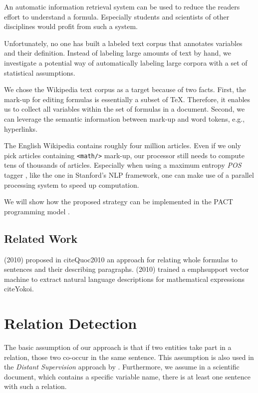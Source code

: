 \documentclass[runningheads]{llncs}
\begin{document}
An automatic information retrieval system can be used to reduce the readers
effort to understand a formula. Especially students and scientists of other
disciplines would profit from such a system.

Unfortunately, no one has built a labeled text corpus that annotates variables
and their definition. Instead of labeling large amounts of text by hand, we
investigate a potential way of automatically labeling large corpora with a set
of statistical assumptions.

We chose the Wikipedia text corpus as a target because of two facts. First,
the mark-up for editing formulas is essentially a subset of \TeX. Therefore,
it enables us to collect all variables within the set of formulas in a
document. Second, we can leverage the semantic information between mark-up and
word tokens, e.g., hyperlinks.

The English Wikipedia contains roughly four million articles. Even if we only
pick articles containing \texttt{<math/>} mark-up, our processor still needs
to compute tens of thousands of articles. Especially when using a maximum
entropy \emph{POS} tagger \cite{Rathna96}, like the one in Stanford's NLP
framework, one can make use of a parallel processing system to speed up
computation.

We will show how the proposed strategy can be implemented in the PACT
programming model \cite{Alexandrov2010}.


\subsection{Related Work}
\citeauthor{Quoc2010} (2010) proposed in cite{Quoc2010} an approach for
relating whole formulas to sentences and their describing paragraphs.
\citeauthor{Yokoi} (2010) trained a emph{support vector machine} to extract
natural language descriptions for mathematical expressions cite{Yokoi}.


\section{Relation Detection}
The basic assumption of our approach is that if two entities take part in a
relation, those two co-occur in the same sentence. This assumption is also
used in the \emph{Distant Supervision} \cite{Mintz2008} approach by
\citeauthor{Mintz2008}. Furthermore, we assume in a scientific document, which
contains a specific variable name, there is at least one sentence with such a
relation.
\end{document}
